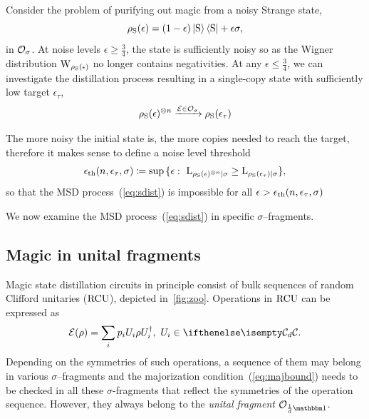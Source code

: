 \documentclass[pra,
aps,
twocolumn,
superscriptaddress,
groupedaddress,
nofootinbib,
reprint
]{revtex4-1}
\begin{document}
Consider the problem of purifying out magic from a noisy Strange state,
\begin{equation}
    \rho_{\rm{S}}(\epsilon) = (1 - \epsilon) \ket{\rm{S}}\bra{\rm{S}} + \epsilon \sigma,
\end{equation}
in $\mathcal{O}_\sigma$.
At noise levels $\epsilon \geq \frac{3}{4}$, the state is sufficiently noisy so as the Wigner distribution $\W{\rho_{\rm{S}}(\epsilon)}$ no longer contains negativities. 
At any $\epsilon \leq \frac{3}{4}$, we can investigate the distillation process resulting in a single-copy state with sufficiently low target $\epsilon_{\tau}$,
\begin{equation}\label{eq:sdist}
	\rho_{\rm{S}}(\epsilon)^{\otimes n} \xrightarrow{\mathcal{E} \in \mathcal{O}_\sigma} \rho_{\rm{S}}(\epsilon_{\tau})
\end{equation}

The more noisy the initial state is, the more copies needed to reach the target, therefore it makes sense to define a noise level threshold 
\begin{equation}\label{eq:ethresh}
	\epsilon_{\rm{th}}(n, \epsilon_\tau, \sigma) \coloneqq \sup{\{\epsilon:\  {{\rm{L}}_{\rho_{\rm{S}}(\epsilon)^{\otimes n}|\sigma}}  \geq  {{\rm{L}}_{\rho_{\rm{S}}(\epsilon_{\tau})|\sigma}} \}},
\end{equation}
so that the MSD process~(\ref{eq:sdist}) is impossible for all $\epsilon > \epsilon_{\rm{th}}(n, \epsilon_\tau, \sigma)$

We now examine the MSD process~(\ref{eq:sdist}) in specific $\sigma$--fragments.

\subsection{Magic in unital fragments}\label{sec:unital}

Magic state distillation circuits in principle consist of bulk sequences of random Clifford unitaries (${\rm{RCU}}$), depicted in~\cref{fig:zoo}.
Operations in ${\rm{RCU}}$ can be expressed as
\begin{equation}
    \E(\rho) = \sum_i p_i U_i \rho U_i^\dagger,\ U_i \in \cd.
\end{equation}
Depending on the symmetries of such operations, a sequence of them may belong in various $\sigma$--fragments and the majorization condition~(\ref{eq:majbound}) needs to be checked in all these $\sigma$-fragments that reflect the symmetries of the operation sequence.
However, they always belong to the \emph{unital fragment} $\O_{\frac{1}{d}\id}$.
\end{document}
